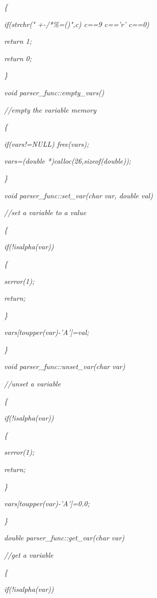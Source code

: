 \documentclass[a4paper,twoside]{book}
\begin{document}
\textit{\{}

\textit{\qquad if(strchr(" +-/*\%=()",c) \TEXTsymbol{\vert}%
\TEXTsymbol{\vert} c==9 \TEXTsymbol{\vert}\TEXTsymbol{\vert} c=='\TEXTsymbol{%
\backslash}r' \TEXTsymbol{\vert}\TEXTsymbol{\vert} c==0)}

\textit{\qquad \qquad return 1;}

\textit{\qquad return 0;}

\textit{\}}

\textit{void parser\_func::empty\_vars()}

\textit{//empty the variable memory}

\textit{\{}

\textit{\qquad if(vars!=NULL) free(vars);}

\textit{\qquad vars=(double *)calloc(26,sizeof(double));}

\textit{\}}

\textit{void parser\_func::set\_var(char var, double val)}

\textit{//set a variable to a value}

\textit{\{}

\textit{\qquad if(!isalpha(var))}

\textit{\qquad \{}

\textit{\qquad \qquad serror(1);}

\textit{\qquad \qquad return;}

\textit{\qquad \}}

\textit{\qquad vars[toupper(var)-'A']=val;}

\textit{\}}

\textit{void parser\_func::unset\_var(char var)}

\textit{//unset a variable}

\textit{\{}

\textit{\qquad if(!isalpha(var))}

\textit{\qquad \{}

\textit{\qquad \qquad serror(1);}

\textit{\qquad \qquad return;}

\textit{\qquad \}}

\textit{\qquad vars[toupper(var)-'A']=0.0;}

\textit{\}}

\textit{double parser\_func::get\_var(char var)}

\textit{//get a variable}

\textit{\{}

\textit{\qquad if(!isalpha(var))}
\end{document}
